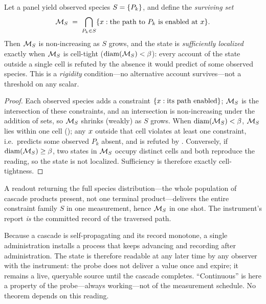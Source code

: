 \begin{theorem}
\label{cfc:thm:rigidity}
Let a panel yield observed species $S=\{P_k\}$, and define the
\emph{surviving set}
\begin{equation}
\mathcal{M}_S\;=\;\bigcap_{P_k\in S}\{x:\text{the path to }P_k\text{ is enabled at }x\}.
\label{cfc:eq:surviving}
\end{equation}
Then $\mathcal{M}_S$ is non-increasing as $S$ grows, and the state is
\emph{sufficiently localized} exactly when $\mathcal{M}_S$ is cell-tight
($\operatorname{diam}(\mathcal{M}_S)<\beta$): every account of the state outside a single cell is
refuted by the absence it would predict of some observed species. This is a
\emph{rigidity} condition---no alternative account survives---not a threshold on
any scalar.
\end{theorem}

\begin{proof}
Each observed species adds a constraint $\{x:\text{its path enabled}\}$;
$\mathcal{M}_S$ is the intersection of these constraints, and an intersection is
non-increasing under the addition of sets, so $\mathcal{M}_S$ shrinks (weakly) as $S$
grows. When $\operatorname{diam}(\mathcal{M}_S)<\beta$, $\mathcal{M}_S$ lies within one cell
(); any $x$ outside that cell violates at least one constraint,
i.e.\ predicts some observed $P_k$ absent, and is refuted by
. Conversely, if $\operatorname{diam}(\mathcal{M}_S)\ge\beta$, two states in
$\mathcal{M}_S$ occupy distinct cells and both reproduce the reading, so the state is
not localized. Sufficiency is therefore exactly cell-tightness.
\end{proof}

\begin{corollary}
\label{cfc:cor:single}
A readout returning the full species distribution---the whole population of
cascade products present, not one terminal product---delivers the entire
constraint family $S$ in one measurement, hence $\mathcal{M}_S$ in one shot. The
instrument's report \emph{is} the committed record of the traversed path.
\end{corollary}

\begin{remark}
\label{cfc:rem:continuous}
Because a cascade is self-propagating and its record monotone, a single
administration installs a process that keeps advancing and recording after
administration. The state is therefore readable at any later time by any
observer with the instrument: the probe does not deliver a value once and
expire; it remains a live, queryable source until the cascade completes.
``Continuous'' is here a property of the probe---always working---not of the
measurement schedule. No theorem depends on this reading.
\end{remark}

